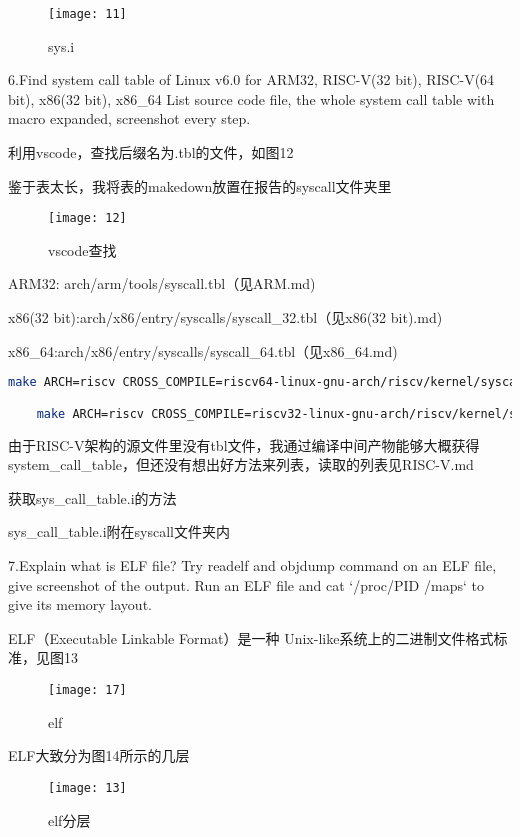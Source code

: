 \documentclass{source/Report}
\begin{document}
\begin{figure}[p]
    \centering
    \texttt{[image: 11]}
    \caption{sys.i}
\end{figure}

6.Find system call table of Linux v6.0 for ARM32, RISC-V(32 bit), RISC-V(64 bit), x86(32 bit), x86\_64 List source code file, the whole system call table with macro expanded, screenshot every step.

利用vscode，查找后缀名为.tbl的文件，如图12

鉴于表太长，我将表的makedown放置在报告的syscall文件夹里

\begin{figure}[p]
    \centering
    \texttt{[image: 12]}
    \caption{vscode查找}
\end{figure}

ARM32: arch/arm/tools/syscall.tbl（见ARM.md)

x86(32 bit):arch/x86/entry/syscalls/syscall\_32.tbl（见x86(32 bit).md)

x86\_64:arch/x86/entry/syscalls/syscall\_64.tbl（见x86\_64.md)

\begin{lstlisting}[language = bash, title = {risc-v获取table}]
    make ARCH=riscv CROSS_COMPILE=riscv64-linux-gnu-arch/riscv/kernel/syscall_table.i #64.bit

    make ARCH=riscv CROSS_COMPILE=riscv32-linux-gnu-arch/riscv/kernel/syscall_table.i #32.bit
\end{lstlisting}

由于RISC-V架构的源文件里没有tbl文件，我通过编译中间产物能够大概获得system\_call\_table，但还没有想出好方法来列表，读取的列表见RISC-V.md

获取sys\_call\_table.i的方法

sys\_call\_table.i附在syscall文件夹内

7.Explain what is ELF file? Try readelf and objdump command on an ELF file, give screenshot of the output. Run an ELF file and cat `/proc/PID /maps` to give its memory layout.

ELF（Executable Linkable Format）是一种 Unix-like系统上的二进制文件格式标准，见图13

\begin{figure}[p]
    \centering
    \texttt{[image: 17]}
    \caption{elf}
\end{figure}

ELF大致分为图14所示的几层

\begin{figure}[p]
    \centering
    \texttt{[image: 13]}
    \caption{elf分层}
\end{figure}
\end{document}
